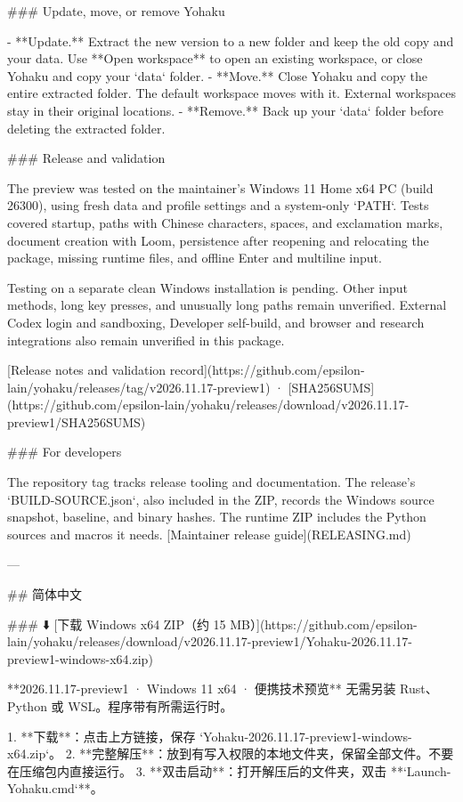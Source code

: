 ### Update, move, or remove Yohaku

- **Update.** Extract the new version to a new folder and keep the old copy and your data. Use **Open workspace** to open an existing workspace, or close Yohaku and copy your `data` folder.
- **Move.** Close Yohaku and copy the entire extracted folder. The default workspace moves with it. External workspaces stay in their original locations.
- **Remove.** Back up your `data` folder before deleting the extracted folder.

### Release and validation

The preview was tested on the maintainer’s Windows 11 Home x64 PC (build 26300), using fresh data and profile settings and a system-only `PATH`. Tests covered startup, paths with Chinese characters, spaces, and exclamation marks, document creation with Loom, persistence after reopening and relocating the package, missing runtime files, and offline Enter and multiline input.

Testing on a separate clean Windows installation is pending. Other input methods, long key presses, and unusually long paths remain unverified. External Codex login and sandboxing, Developer self-build, and browser and research integrations also remain unverified in this package.

[Release notes and validation record](https://github.com/epsilon-lain/yohaku/releases/tag/v2026.11.17-preview1) · [SHA256SUMS](https://github.com/epsilon-lain/yohaku/releases/download/v2026.11.17-preview1/SHA256SUMS)

### For developers

The repository tag tracks release tooling and documentation. The release’s `BUILD-SOURCE.json`, also included in the ZIP, records the Windows source snapshot, baseline, and binary hashes. The runtime ZIP includes the Python sources and macros it needs. [Maintainer release guide](RELEASING.md)

---

## 简体中文

### ⬇️ [下载 Windows x64 ZIP（约 15 MB）](https://github.com/epsilon-lain/yohaku/releases/download/v2026.11.17-preview1/Yohaku-2026.11.17-preview1-windows-x64.zip)

**2026.11.17-preview1 · Windows 11 x64 · 便携技术预览**
无需另装 Rust、Python 或 WSL。程序带有所需运行时。

1. **下载**：点击上方链接，保存 `Yohaku-2026.11.17-preview1-windows-x64.zip`。
2. **完整解压**：放到有写入权限的本地文件夹，保留全部文件。不要在压缩包内直接运行。
3. **双击启动**：打开解压后的文件夹，双击 **`Launch-Yohaku.cmd`**。

